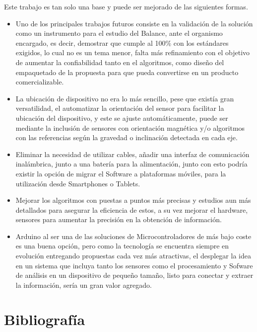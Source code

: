 \documentclass[12pt,a4paper]{article}
\begin{document}
Este trabajo es tan solo una base y puede ser mejorado de las siguientes formas.

\begin{itemize}
	\item Uno de los principales trabajos futuros consiste en la validación de la solución como un instrumento para el estudio del Balance, ante el organismo encargado, es decir, demostrar que cumple al 100\% con los estándares exigidos, lo cual no es un tema menor, falta más refinamiento con el objetivo de aumentar la confiabilidad tanto en el algoritmos, como diseño del empaquetado de la propuesta para que pueda convertirse en un producto comercializable.
	
	\item La ubicación de dispositivo no era lo más sencillo, pese que existía gran versatilidad, el automatizar la orientación del sensor para facilitar la ubicación del dispositivo, y este se ajuste automáticamente, puede ser mediante la inclusión de sensores con orientación magnética y/o algoritmos con las referencias según la gravedad o inclinación detectada en cada eje.
	
	\item Eliminar la necesidad de utilizar cables, añadir una interfaz de comunicación inalámbrica, junto a una batería para la alimentación, junto con esto podría existir la opción de migrar el Software a plataformas móviles, para la utilización desde Smartphones o Tablets.
	
	\item Mejorar los algoritmos con puestas a puntos más precisas y estudios aun más detallados para asegurar la eficiencia de estos, a su vez mejorar el hardware, sensores para aumentar la precisión en la obtención de información.
	
	\item Arduino al ser una de las soluciones de Microcontroladores de más bajo coste es una buena opción, pero como la tecnología se encuentra siempre en evolución entregando propuestas cada vez más atractivas, el desplegar la idea en un sistema que incluya tanto los sensores como el procesamiento y Sofware de análisis en un dispositivo de pequeño tamaño, listo para conectar y extraer la información, sería un gran valor agregado.
	
\end{itemize}

\section{Bibliografía}
\printbibliography[heading=none]
\end{document}
